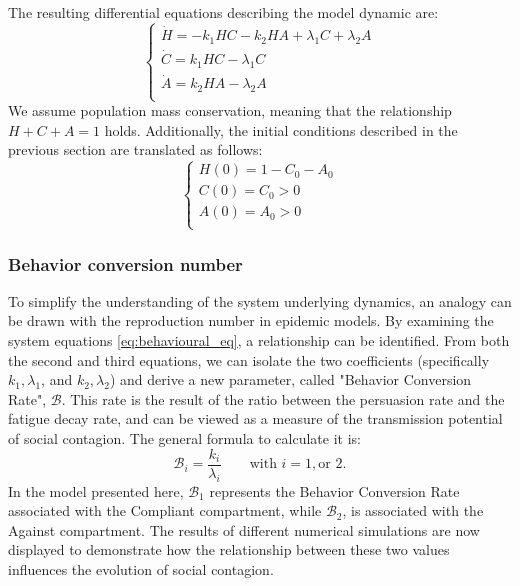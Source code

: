 The resulting differential equations describing the model dynamic are:
\begin{equation}
	\label{eq:behavioural_eq}
	\begin{cases}
		\dot{H} = -k_1 H C - k_2 H A + \lambda_1 C + \lambda_2 A \\
		\dot{C} = k_1 H C -  \lambda_1 C \\
		\dot{A} = k_2 H A -  \lambda_2 A\\
	\end{cases}
\end{equation}
We assume population mass conservation, meaning that the relationship $H + C + A = 1$ holds. Additionally, the initial conditions described in the previous section are translated as follows:
\begin{equation}
	\begin{cases}
		H(0) = 1 - C_0 - A_0\\
		C(0) = C_0 > 0\\
		A(0) = A_0 > 0\\
	\end{cases}
\end{equation}

\subsubsection{Behavior conversion number}

To simplify the understanding of the system underlying dynamics, an analogy can be drawn with the reproduction number in epidemic models. By examining the system equations \eqref{eq:behavioural_eq}, a relationship can be identified. From both the second and third equations, we can isolate the two coefficients (specifically $k_1 , \lambda_1 $, and  $k_2 , \lambda_2 $)  and derive a new parameter, called "Behavior Conversion Rate", $\mathcal{B}$. This rate is the result of the ratio between the persuasion rate and the fatigue decay rate, and can be viewed as a measure of the transmission potential of social contagion. The general formula to calculate it is:
\begin{equation}
	\mathcal{B}_i =\frac{ k_i }{\lambda_i}  \qquad \text{with } i = 1, \text{or } 2.
	\label{eq:behave_rate}
\end{equation}
In the model presented here, $\mathcal{B}_1$ represents the Behavior Conversion Rate associated with the Compliant compartment, while $\mathcal{B}_2$, is associated with the Against compartment. The results of different numerical simulations are now displayed to demonstrate how the relationship between these two values influences the evolution of social contagion.

